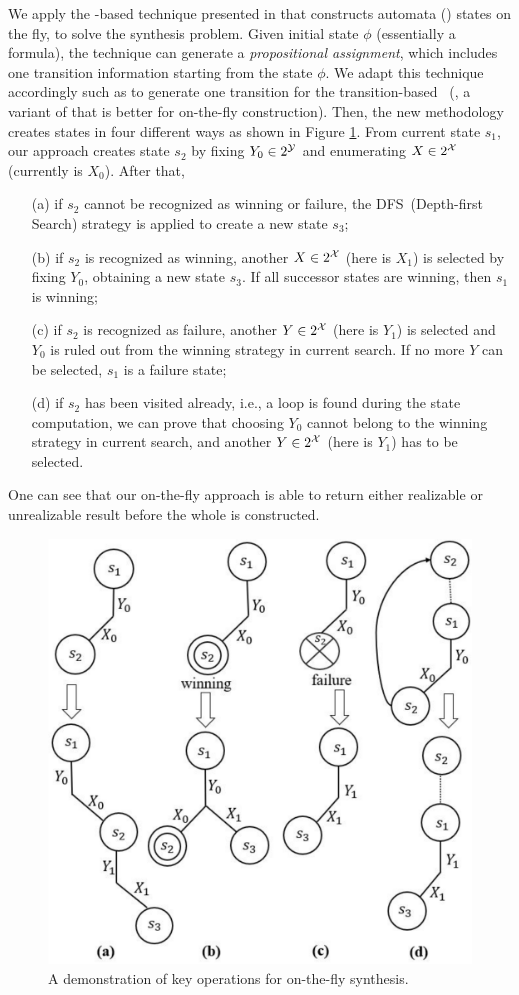 We apply the \SAT-based technique presented in \cite{LRPZV19} that constructs automata (\NFA) states on the fly, to solve the synthesis problem. Given initial state $\phi$ (essentially a formula), the technique can generate a \emph{propositional assignment}, which includes one transition information starting from the state $\phi$. We adapt this technique accordingly such as to generate one transition for the transition-based \DFA~(\tdfa, a variant of \dfa that is better for on-the-fly construction). Then, the new methodology creates \tdfa states in four different ways as shown in Figure \ref{fig:demonstration}. From current state $s_1$, our approach creates state $s_2$ by fixing $Y_0\in 2^{\mathcal{Y}}$ and enumerating $X\in 2^{\mathcal{X}}$ (currently is $X_0$). After that,
\begin{itemize}
    \item[(a)]  if $s_2$ cannot be recognized as winning or failure, the DFS~(Depth-first Search) strategy is applied to create a new state $s_3$;
    \item[(b)] if $s_2$ is recognized as winning, another $X\in 2^{\mathcal{X}}$ (here is $X_1$) is selected by fixing $Y_0$, obtaining a new state $s_3$. If all successor states are winning, then $s_1$ is winning;
    \item[(c)] if $s_2$ is recognized as failure, another $Y\in 2^{\mathcal{X}}$ (here is $Y_1$) is selected and $Y_0$ is ruled out from the winning strategy in current search. If no more $Y$ can be selected, $s_1$ is a failure state;
    \item[(d)] if $s_2$ has been visited already, i.e., a loop is found during the state computation, we can prove that choosing $Y_0$ cannot belong to the winning strategy in current search, and another $Y\in 2^{\mathcal{X}}$ (here is $Y_1$) has to be selected. 
\end{itemize}

One can see that our on-the-fly approach is able to return either realizable or unrealizable result before the whole \dfa is constructed. 

\begin{figure}
    \centering
    \includegraphics[scale=0.35]{demonstration.pdf}
    \caption{A demonstration of key operations for on-the-fly \ltlf synthesis.}
    \label{fig:demonstration}
\end{figure}



